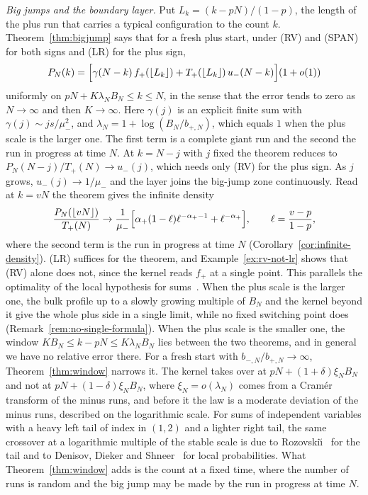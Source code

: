\emph{Big jumps and the boundary layer.} Put $L_k=(k-pN)/(1-p)$, the length of the plus run
that carries a typical configuration to the count $k$. Theorem~\ref{thm:bigjump} says that
for a fresh plus start, under (RV) and (SPAN) for both signs and (LR) for the plus sign,
\[
 P_N(k)=\Bigl[\gamma(N-k)\,f_{+}(\lfloor L_k\rfloor)+T_{+}(\lfloor L_k\rfloor)\,u_{-}(N-k)\Bigr](1+o(1))
\]
uniformly on $pN+K\lambda_NB_N\le k\le N$, in the sense that the error tends to zero as
$N\to\infty$ and then $K\to\infty$. Here $\gamma(j)$ is an explicit finite sum with
$\gamma(j)\sim js/\mu_\minus^2$, and $\lambda_N=1+\log(B_N/b_{\plus,N})$, which equals $1$ when
the plus scale is the larger one. The first term is a complete giant run and the second the
run in progress at time $N$. At $k=N-j$ with $j$ fixed the theorem reduces to
$P_N(N-j)/T_\plus(N)\to u_\minus(j)$, which needs only (RV) for the plus sign. As $j$ grows,
$u_\minus(j)\to1/\mu_\minus$ and the layer joins the big-jump zone continuously. Read at
$k=vN$ the theorem gives the infinite density
\[
 \frac{P_N(\lfloor vN\rfloor)}{T_{+}(N)}\to
 \frac1{\mu_{-}}\Bigl[\alpha_{+}(1-\ell)\ell^{-\alpha_{+}-1}+\ell^{-\alpha_{+}}\Bigr],
 \qquad \ell=\frac{v-p}{1-p},
\]
where the second term is the run in progress at time $N$
(Corollary~\ref{cor:infinite-density}). (LR) suffices for the theorem, and
Example~\ref{ex:rv-not-lr} shows that (RV) alone does not, since the kernel reads $f_\plus$ at
a single point. This parallels the optimality of the local hypothesis for
sums~\cite[Eq.~(2.4)]{berger2019ptrf}. When the plus scale is the larger one, the bulk profile
up to a slowly growing multiple of $B_N$ and the kernel beyond it give the whole plus side in a
single limit, while no fixed switching point does (Remark~\ref{rem:no-single-formula}). When
the plus scale is the smaller one, the window $KB_N\le k-pN\le K\lambda_NB_N$ lies between the
two theorems, and in general we have no relative error there. For a fresh start with
$b_{\minus,N}/b_{\plus,N}\to\infty$, Theorem~\ref{thm:window} narrows it. The kernel takes over
at $pN+(1+\delta)\xi_NB_N$ and not at $pN+(1-\delta)\xi_NB_N$, where $\xi_N=o(\lambda_N)$ comes
from a Cram\'er transform of the minus runs, and before it the law is a moderate deviation of
the minus runs, described on the logarithmic scale. For sums of independent variables with a
heavy left tail of index in $(1,2)$ and a lighter right tail, the same crossover at a
logarithmic multiple of the stable scale is due to Rozovski\u{\i}~\cite{rozovskii1997} for the
tail and to Denisov, Dieker and Shneer~\cite[Section~9.2]{dds2008} for local probabilities.
What Theorem~\ref{thm:window} adds is the count at a fixed time, where the number of runs is
random and the big jump may be made by the run in progress at time $N$.

